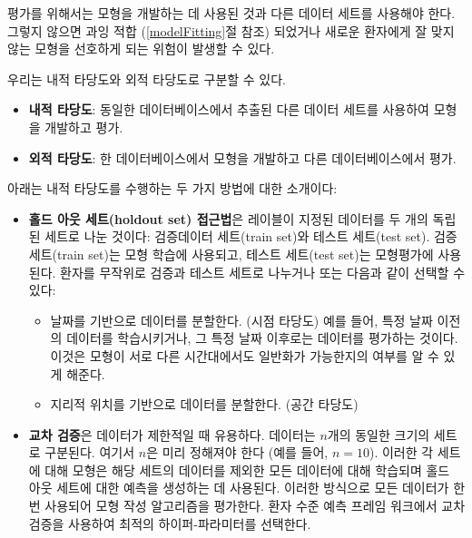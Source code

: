 \documentclass[11pt]{book}
\providecommand{\tightlist}{%
  \setlength{\itemsep}{0pt}\setlength{\parskip}{0pt}}
\theoremstyle{definition}
\theoremstyle{definition}
\theoremstyle{definition}
\theoremstyle{remark}
\let\BeginKnitrBlock\begin \let\EndKnitrBlock\end
\begin{document}
\BeginKnitrBlock{rmdimportant}
평가를 위해서는 모형을 개발하는 데 사용된 것과 다른 데이터 세트를
사용해야 한다. 그렇지 않으면 과잉 적합 (\ref{modelFitting}절 참조)
되었거나 새로운 환자에게 잘 맞지 않는 모형을 선호하게 되는 위험이 발생할
수 있다.
\EndKnitrBlock{rmdimportant}

우리는 내적 타당도와 외적 타당도로 구분할 수 있다.

\begin{itemize}
\tightlist
\item
  \textbf{내적 타당도}: 동일한 데이터베이스에서 추출된 다른 데이터
  세트를 사용하여 모형을 개발하고 평가.
\item
  \textbf{외적 타당도}: 한 데이터베이스에서 모형을 개발하고 다른
  데이터베이스에서 평가. 
\end{itemize}

아래는 내적 타당도를 수행하는 두 가지 방법에 대한 소개이다:

\begin{itemize}
\tightlist
\item
  \textbf{홀드 아웃 세트(holdout set) 접근법}은 레이블이 지정된 데이터를
  두 개의 독립된 세트로 나눈 것이다: 검증데이터 세트(train set)와 테스트
  세트(test set). 검증 세트(train set)는 모형 학습에 사용되고, 테스트
  세트(test set)는 모형평가에 사용된다. 환자를 무작위로 검증과 테스트
  세트로 나누거나 또는 다음과 같이 선택할 수 있다:

  \begin{itemize}
  \tightlist
  \item
    날짜를 기반으로 데이터를 분할한다. (시점 타당도) 예를 들어, 특정
    날짜 이전의 데이터를 학습시키거나, 그 특정 날짜 이후로는 데이터를
    평가하는 것이다. 이것은 모형이 서로 다른 시간대에서도 일반화가
    가능한지의 여부를 알 수 있게 해준다.
  \item
    지리적 위치를 기반으로 데이터를 분할한다. (공간 타당도)
  \end{itemize}
\item
  \textbf{교차 검증}은 데이터가 제한적일 때 유용하다. 데이터는 \(n\)개의
  동일한 크기의 세트로 구분된다. 여기서 \(n\)은 미리 정해져야 한다 (예를
  들어, \(n=10\)). 이러한 각 세트에 대해 모형은 해당 세트의 데이터를
  제외한 모든 데이터에 대해 학습되며 홀드 아웃 세트에 대한 예측을
  생성하는 데 사용된다. 이러한 방식으로 모든 데이터가 한 번 사용되어
  모형 작성 알고리즘을 평가한다. 환자 수준 예측 프레임 워크에서 교차
  검증을 사용하여 최적의 하이퍼-파라미터를 선택한다.
\end{itemize}
\end{document}

